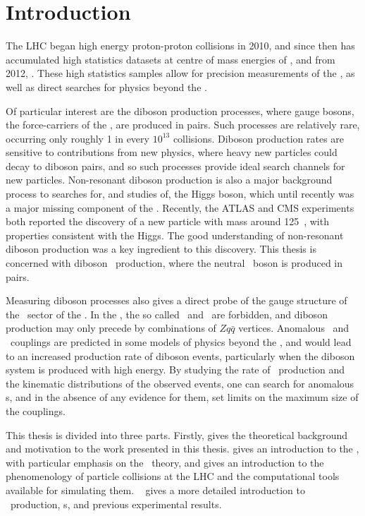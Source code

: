 \graphicspath{{Chapters/Introduction/Figures/}}

\chapter*{Introduction}
\label{chap:Introduction}

The LHC began high energy proton-proton collisions in 2010, and since then
has accumulated high statistics datasets at centre of mass energies of
, and from 2012, . These high statistics samples
allow for precision measurements of the \sm, as well as direct searches for
physics beyond the \sm. 

Of particular interest are the diboson production processes, where gauge bosons,
the force-carriers of the \sm, are produced in pairs. Such processes are
relatively rare, occurring only roughly 1 in every $10^{13}$
collisions. Diboson production rates are sensitive to contributions from new
physics, where heavy new particles could decay to diboson pairs, and so such
processes provide ideal search channels for new particles. Non-resonant diboson
production is also a major background process to searches for, and studies of,
the Higgs boson, which until recently was a major missing component of the \sm.
Recently, the ATLAS and CMS experiments both reported the discovery of a new
particle with mass around 125~\gev, with properties consistent with the Higgs.
The good understanding of non-resonant diboson production was a key ingredient
to this discovery. This thesis is concerned with diboson \ZZ\ production, where
the neutral \Z\ boson is produced in pairs.

Measuring diboson processes also gives a direct probe of the gauge structure of
the \ew\ sector of the \sm. In the \sm, the so called  \ZZZ\ and \ZZg\ are forbidden, and diboson production may
only precede by combinations of $Zq\bar{q}$ vertices. Anomalous \ZZZ\ and \ZZg\ couplings are
predicted in some models of physics beyond the \sm, and would lead to an
increased production rate of diboson events, particularly when the diboson
system is produced with high energy. By studying the rate of \ZZ\ production and
the kinematic distributions of the observed events, one can search for anomalous
\TGC s, and in the absence of any evidence for them, set limits on the maximum
size of the couplings.

This thesis is divided into three parts. Firstly,  gives the theoretical background
and motivation to the work presented in this thesis.  gives an
introduction to the \sm, with particular emphasis on the \ew\ theory, and gives
an introduction to the phenomenology of particle collisions at the LHC and the
computational tools available for simulating them. ~ gives a more
detailed introduction to \ZZ\ production, \TGC s, and previous experimental
results.

